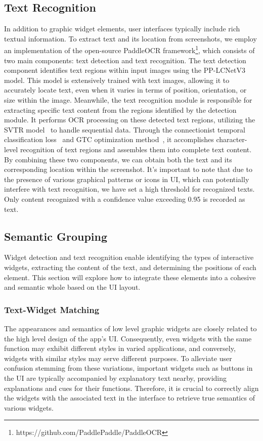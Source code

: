 \subsection{Text Recognition}
In addition to graphic widget elements, user interfaces typically include rich textual information. To extract text and its location from screenshots, we employ an implementation of the open-source PaddleOCR framework\footnote{https://github.com/PaddlePaddle/PaddleOCR}, which consists of two main components: text detection and text recognition. The text detection component identifies text regions within input images using the PP-LCNetV3 model. This model is extensively trained with text images, allowing it to accurately locate text, even when it varies in terms of position, orientation, or size within the image. Meanwhile, the text recognition module is responsible for extracting specific text content from the regions identified by the detection module. It performs OCR processing on these detected text regions, utilizing the SVTR model~\cite{ijcai2022p124} to handle sequential data. Through the connectionist temporal classification loss~\cite{graves2006connectionist} and GTC optimization method~\cite{hu2020gtc}, it accomplishes character-level recognition of text regions and assembles them into complete text content. By combining these two components, we can obtain both the text and its corresponding location within the screenshot. It's important to note that due to the presence of various graphical patterns or icons in UI, which can potentially interfere with text recognition, we have set a high threshold for recognized texts. Only content recognized with a confidence value exceeding 0.95 is recorded as text.

\subsection{Semantic Grouping}
Widget detection and text recognition enable identifying the types of interactive widgets, extracting the content of the text, and determining the positions of each element. This section will explore how to integrate these elements into a cohesive and semantic whole based on the UI layout.

\subsubsection{Text-Widget Matching}
The appearances and semantics of low level graphic widgets are closely related to the high level design of the app's UI. Consequently, even widgets with the same function may exhibit different styles in varied applications, and conversely, widgets with similar styles may serve different purposes. To alleviate user confusion stemming from these variations, important widgets such as buttons in the UI are typically accompanied by explanatory text nearby, providing explanations and cues for their functions. Therefore, it is crucial to correctly align the widgets with the associated text in the interface to retrieve true semantics of various widgets.

